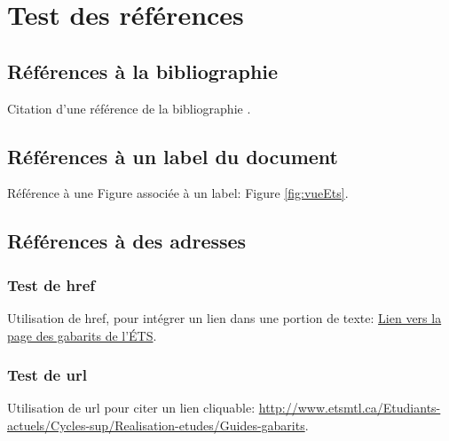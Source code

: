 \documentclass[letterpaper%
, twoside%
, 12pt%
, these%
, francais
, creativecommons, hyperref, withAlgo2e%
]{thETS}
\begin{document}
\section{Test des références}

\subsection{Références à la bibliographie}

Citation d'une référence de la bibliographie \cite{Arica2002}.

\subsection{Références à un label du document}

Référence à une Figure associée à un label: Figure \ref{fig:vueEts}.

\subsection{Références à des adresses}

\subsubsection{Test de href}

Utilisation de href, pour intégrer un lien dans une portion de texte:
\href{http://www.etsmtl.ca/Etudiants-actuels/Cycles-sup/Realisation-etudes/Guides-gabarits}{Lien vers la page des gabarits de l'ÉTS}.

\subsubsection{Test de url}

Utilisation de url pour citer un lien cliquable:
\url{http://www.etsmtl.ca/Etudiants-actuels/Cycles-sup/Realisation-etudes/Guides-gabarits}.


\begin{conclusion}

\lipsum[1] %

\end{conclusion}


\appendix

\multiannexe
\end{document}

